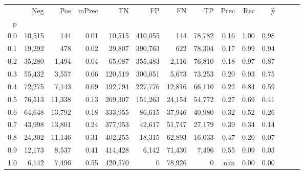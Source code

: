 \begin{tabular}{rrrrrrrrrrrrrr}
\toprule
{} &     Neg &     Pos & mPrec &       TN &       FP &      FN &      TP &  Prec &   Rec & $\hat{p}$ \\
p   &         &         &       &          &          &         &         &       &       &           \\
\midrule
0.0 &  10,515 &     144 &  0.01 &   10,515 &  410,055 &     144 &  78,782 &  0.16 &  1.00 &      0.98 \\
0.1 &  19,292 &     478 &  0.02 &   29,807 &  390,763 &     622 &  78,304 &  0.17 &  0.99 &      0.94 \\
0.2 &  35,280 &   1,494 &  0.04 &   65,087 &  355,483 &   2,116 &  76,810 &  0.18 &  0.97 &      0.87 \\
0.3 &  55,432 &   3,557 &  0.06 &  120,519 &  300,051 &   5,673 &  73,253 &  0.20 &  0.93 &      0.75 \\
0.4 &  72,275 &   7,143 &  0.09 &  192,794 &  227,776 &  12,816 &  66,110 &  0.22 &  0.84 &      0.59 \\
0.5 &  76,513 &  11,338 &  0.13 &  269,307 &  151,263 &  24,154 &  54,772 &  0.27 &  0.69 &      0.41 \\
0.6 &  64,648 &  13,792 &  0.18 &  333,955 &   86,615 &  37,946 &  40,980 &  0.32 &  0.52 &      0.26 \\
0.7 &  43,998 &  13,801 &  0.24 &  377,953 &   42,617 &  51,747 &  27,179 &  0.39 &  0.34 &      0.14 \\
0.8 &  24,302 &  11,146 &  0.31 &  402,255 &   18,315 &  62,893 &  16,033 &  0.47 &  0.20 &      0.07 \\
0.9 &  12,173 &   8,537 &  0.41 &  414,428 &    6,142 &  71,430 &   7,496 &  0.55 &  0.09 &      0.03 \\
1.0 &   6,142 &   7,496 &  0.55 &  420,570 &        0 &  78,926 &       0 &   nan &  0.00 &      0.00 \\
\bottomrule
\end{tabular}
